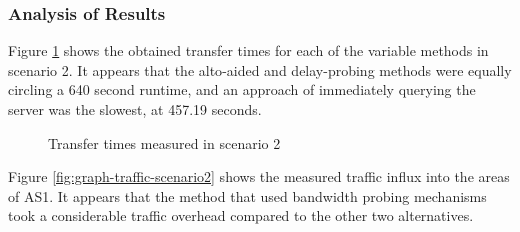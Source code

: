 \subsubsection{Analysis of Results}

Figure \ref{fig:graph-execution-scenario2} shows the obtained transfer times for each of the variable methods in scenario 2.
It appears that the \gls{alto}-aided and delay-probing methods were equally circling a 640 second runtime, and an approach of immediately querying the server was the slowest, at 457.19 seconds.

\begin{figure}[H]
\centering
{} %
\caption{Transfer times measured in scenario 2}
\label{fig:graph-execution-scenario2}
\end{figure}

Figure \ref{fig:graph-traffic-scenario2} shows the measured traffic influx into the areas of AS1.
It appears that the method that used bandwidth probing mechanisms took a considerable traffic overhead compared to the other two alternatives.

